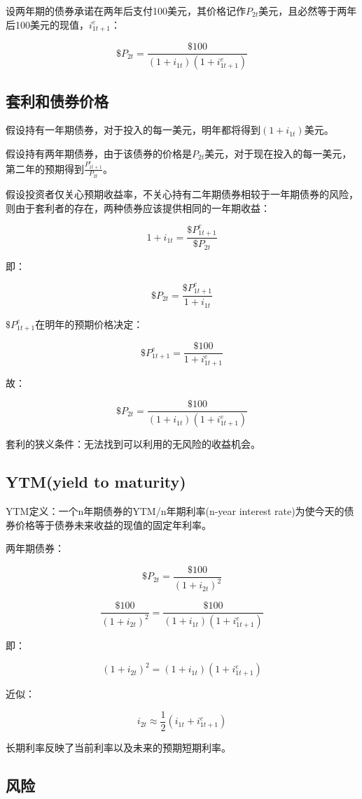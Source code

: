 \documentclass{article}
\begin{document}
设两年期的债券承诺在两年后支付100美元，其价格记作$ P_{2t} $美元，且必然等于两年后100美元的现值，$ i^e_{1t+1} $：

\[
\$P_{2t}=\frac{\$100}{(1+i_{1t})(1+i^e_{1t+1})}
\]


\subsection{套利和债券价格}

假设持有一年期债券，对于投入的每一美元，明年都将得到$ (1+i_{1t}) $美元。

假设持有两年期债券，由于该债券的价格是$ P_{2t} $美元，对于现在投入的每一美元，第二年的预期得到$ \frac{P^e_{1t+1}}{P_{2t}} $。

假设投资者仅关心预期收益率，不关心持有二年期债券相较于一年期债券的风险，则由于套利者的存在，两种债券应该提供相同的一年期收益：

\[
1+i_{1t}=\frac{\$P^e_{1t+1}}{\$P_{2t}}
\]

即：

\[
\$P_{2t}=\frac{\$P^e_{1t+1}}{1+i_{1t}}
\]

$ \$P^e_{1t+1} $在明年的预期价格决定：

\[
\$P^e_{1t+1}=\frac{\$100}{1+i^e_{1t+1}}
\]

故：

\[
\$P_{2t}=\frac{\$100}{(1+i_{1t})(1+i^e_{1t+1})}
\]

套利的狭义条件：无法找到可以利用的无风险的收益机会。

\subsection{YTM(yield to maturity)}

YTM定义：一个n年期债券的YTM/n年期利率(n-year interest rate)为使今天的债券价格等于债券未来收益的现值的固定年利率。

两年期债券：

\[
\$P_{2t}=\frac{\$100}{(1+i_{2t})^2}
\]

\[
\frac{\$100}{(1+i_{2t})^2}=\frac{\$100}{(1+i_{1t})(1+i^e_{1t+1})}
\]

即：

\[
(1+i_{2t})^2=(1+i_{1t})(1+i^e_{1t+1})
\]

近似：

\[
i_{2t}\approx \frac{1}{2}(i_{1t}+i^e_{1t+1})
\]

长期利率反映了当前利率以及未来的预期短期利率。

\subsection{风险}
\end{document}
